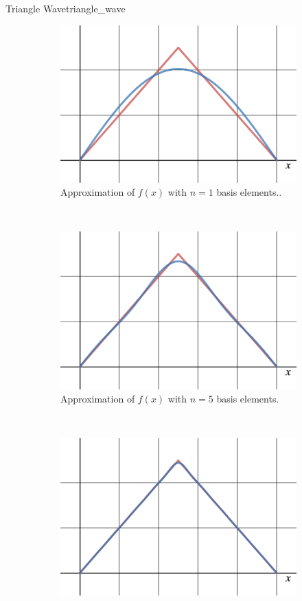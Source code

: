 \begin{ex}{Triangle Wave}{triangle_wave}
	\begin{figure}[H]
	\centering
		\begin{subfigure}[h]{0.49\textwidth}
			\centering
			\includegraphics[width=.8\textwidth]{Figures_Part_5/triangle_n=1.png}
			\caption{Approximation of $f(x)$ with $n=1$ basis elements..}
		\end{subfigure}
		~
		\begin{subfigure}[h]{0.49\textwidth}
			\centering
			\includegraphics[width=.8\textwidth]{Figures_Part_5/triangle_n=5.png}
			\caption{Approximation of $f(x)$ with $n=5$ basis elements.}
		\end{subfigure}
		\\
		\begin{subfigure}[h]{0.49\textwidth}
			\centering
			\includegraphics[width=.8\textwidth]{Figures_Part_5/triangle_n=20.png}

\end{subfigure}
\end{figure}
\end{ex}
